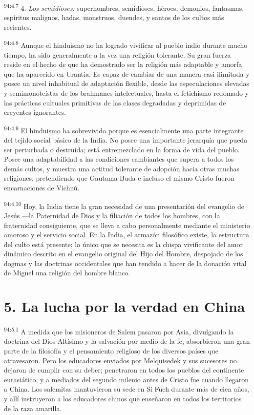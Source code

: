 \par
\textsuperscript{94:4.7} 4. \textit{Los semidioses:} superhombres, semidioses, héroes, demonios, fantasmas, espíritus malignos, hadas, monstruos, duendes, y santos de los cultos más recientes.

\par
\textsuperscript{94:4.8} Aunque el hinduismo no ha logrado vivificar al pueblo indio durante mucho tiempo, ha sido generalmente a la vez una religión tolerante. Su gran fuerza reside en el hecho de que ha demostrado ser la religión más adaptable y amorfa que ha aparecido en Urantia. Es capaz de cambiar de una manera casi ilimitada y posee un nivel inhabitual de adaptación flexible, desde las especulaciones elevadas y semimonoteístas de los brahmanes intelectuales, hasta el fetichismo redomado y las prácticas cultuales primitivas de las clases degradadas y deprimidas de creyentes ignorantes.

\par
\textsuperscript{94:4.9} El hinduismo ha sobrevivido porque es esencialmente una parte integrante del tejido social básico de la India. No posee una importante jerarquía que pueda ser perturbada o destruida; está entremezclado en la forma de vida del pueblo. Posee una adaptabilidad a las condiciones cambiantes que supera a todos los demás cultos, y muestra una actitud tolerante de adopción hacia otras muchas religiones, pretendiendo que Gautama Buda e incluso el mismo Cristo fueron encarnaciones de Vichnú.

\par
\textsuperscript{94:4.10} Hoy, la India tiene la gran necesidad de una presentación del evangelio de Jesús ---la Paternidad de Dios y la filiación de todos los hombres, con la fraternidad consiguiente, que se lleva a cabo personalmente mediante el ministerio amoroso y el servicio social. En la India, el armazón filosófico existe, la estructura del culto está presente; lo único que se necesita es la chispa vivificante del amor dinámico descrito en el evangelio original del Hijo del Hombre, despojado de los dogmas y las doctrinas occidentales que han tendido a hacer de la donación vital de Miguel una religión del hombre blanco.

\section*{5. La lucha por la verdad en China}
\par
\textsuperscript{94:5.1} A medida que los misioneros de Salem pasaron por Asia, divulgando la doctrina del Dios Altísimo y la salvación por medio de la fe, absorbieron una gran parte de la filosofía y el pensamiento religioso de los diversos países que atravesaron. Pero los educadores enviados por Melquisedek y sus sucesores no dejaron de cumplir con su deber; penetraron en todos los pueblos del continente eurasiático, y a mediados del segundo milenio antes de Cristo fue cuando llegaron a China. Los salemitas mantuvieron su sede en Si Fuch durante más de cien años, y allí instruyeron a los educadores chinos que enseñaron en todos los territorios de la raza amarilla.

